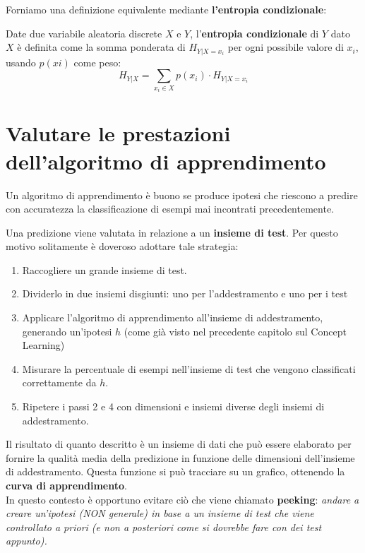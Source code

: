 Forniamo una definizione equivalente mediante \textbf{l'entropia condizionale}:
\begin{definizione}
Date due variabile aleatoria discrete $X$ e $Y$, l'\textbf{entropia condizionale} di $Y$ dato $X$ è definita come la somma ponderata di $H_{Y|X=x_i}$ per ogni possibile valore di $x_i$, usando $p(xi)$ come peso:
  \begin{equation}
    H_{Y|X}=\sum_{x_i\in X} p(x_i)\cdot H_{Y|X=x_i}
    \label{EntropiaCondizionale}
\end{equation}
\end{definizione}

\section{Valutare le prestazioni dell'algoritmo di apprendimento}
\begin{definizione}
  Un algoritmo di apprendimento è buono se produce ipotesi che riescono a predire con accuratezza la classificazione di esempi mai incontrati precedentemente.
\end{definizione}
Una predizione viene valutata in relazione a un \textbf{insieme di test}. Per questo motivo solitamente è doveroso adottare tale strategia:
\begin{enumerate}
    \item Raccogliere un grande insieme di test.
    \item Dividerlo in due insiemi disgiunti: uno per l'addestramento e uno per i test
    \item Applicare l'algoritmo di apprendimento all'insieme di addestramento, generando un'ipotesi $h$ (come già visto nel precedente capitolo sul Concept Learning)
    \item Misurare la percentuale di esempi nell'insieme di test che vengono classificati correttamente da $h$.
    \item Ripetere i passi 2 e 4 con dimensioni e insiemi diverse degli insiemi di addestramento.
\end{enumerate}
Il risultato di quanto descritto è un insieme di dati che può essere elaborato per fornire la qualità media della predizione in funzione delle dimensioni dell'insieme di addestramento. Questa funzione si può tracciare su un grafico, ottenendo la \textbf{curva di apprendimento}. \\ In questo contesto è opportuno evitare ciò che viene chiamato \textbf{peeking}: \textit{andare a creare un'ipotesi (NON generale) in base a un insieme di test che viene controllato a priori (e non a posteriori come si dovrebbe fare con dei test appunto).}
